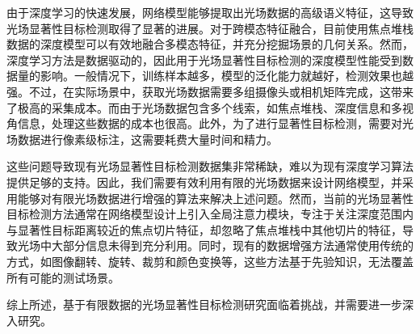 %
%





由于深度学习的快速发展，网络模型能够提取出光场数据的高级语义特征，这导致光场显著性目标检测取得了显著的进展。对于跨模态特征融合，目前使用焦点堆栈数据的深度模型可以有效地融合多模态特征，并充分挖掘场景的几何关系。然而，深度学习方法是数据驱动的，因此用于光场显著性目标检测的深度模型性能受到数据量的影响。一般情况下，训练样本越多，模型的泛化能力就越好，检测效果也越强。不过，在实际场景中，获取光场数据需要多组摄像头或相机矩阵完成，这带来了极高的采集成本。而由于光场数据包含多个线索，如焦点堆栈、深度信息和多视角信息，处理这些数据的成本也很高。此外，为了进行显著性目标检测，需要对光场数据进行像素级标注，这需要耗费大量时间和精力。

这些问题导致现有光场显著性目标检测数据集非常稀缺，难以为现有深度学习算法提供足够的支持。因此，我们需要有效利用有限的光场数据来设计网络模型，并采用能够对有限光场数据进行增强的算法来解决上述问题。然而，当前的光场显著性目标检测方法通常在网络模型设计上引入全局注意力模块，专注于关注深度范围内与显著性目标距离较近的焦点切片特征，却忽略了焦点堆栈中其他切片的特征，导致光场中大部分信息未得到充分利用。同时，现有的数据增强方法通常使用传统的方式，如图像翻转、旋转、裁剪和颜色变换等，这些方法基于先验知识，无法覆盖所有可能的测试场景。

综上所述，基于有限数据的光场显著性目标检测研究面临着挑战，并需要进一步深入研究。





%
%




